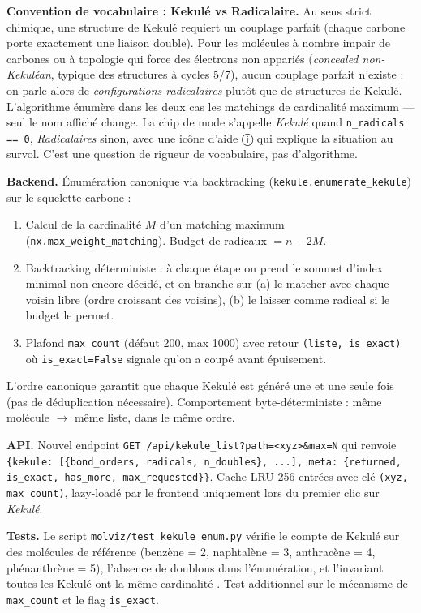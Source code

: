 \textbf{Convention de vocabulaire : Kekulé vs Radicalaire.} Au sens strict
chimique, une structure de Kekulé requiert un couplage parfait (chaque carbone
porte exactement une liaison double). Pour les molécules à nombre impair de
carbones ou à topologie qui force des électrons non appariés (\emph{concealed
non-Kekuléan}, typique des structures à cycles 5/7), aucun couplage parfait
n'existe : on parle alors de \emph{configurations radicalaires} plutôt que de
structures de Kekulé. L'algorithme énumère dans les deux cas les matchings de
cardinalité maximum --- seul le nom affiché change. La chip de mode s'appelle
\emph{Kekulé} quand \texttt{n\_radicals == 0}, \emph{Radicalaires} sinon, avec
une icône d'aide \og{}ⓘ\fg{} qui explique la situation au survol. C'est une
question de rigueur de vocabulaire, pas d'algorithme.

\textbf{Backend.} Énumération canonique via backtracking
(\texttt{kekule.enumerate\_kekule}) sur le squelette carbone :

\begin{enumerate}
  \item Calcul de la cardinalité $M$ d'un matching maximum
    (\texttt{nx.max\_weight\_matching}). Budget de radicaux $= n - 2M$.
  \item Backtracking déterministe : à chaque étape on prend le sommet
    d'index minimal non encore décidé, et on branche sur (a) le matcher
    avec chaque voisin libre (ordre croissant des voisins), (b) le laisser
    comme radical si le budget le permet.
  \item Plafond \texttt{max\_count} (défaut 200, max 1000) avec retour
    \texttt{(liste, is\_exact)} où \texttt{is\_exact=False} signale qu'on
    a coupé avant épuisement.
\end{enumerate}

L'ordre canonique garantit que chaque Kekulé est généré une et une seule
fois (pas de déduplication nécessaire). Comportement byte-déterministe :
même molécule $\to$ même liste, dans le même ordre.

\textbf{API.} Nouvel endpoint \texttt{GET /api/kekule\_list?path=<xyz>\&max=N}
qui renvoie \texttt{\{kekule: [\{bond\_orders, radicals, n\_doubles\}, ...],
meta: \{returned, is\_exact, has\_more, max\_requested\}\}}. Cache LRU 256
entrées avec clé \texttt{(xyz, max\_count)}, lazy-loadé par le frontend
uniquement lors du premier clic sur \emph{Kekulé}.

\textbf{Tests.} Le script
\texttt{molviz/test\_kekule\_enum.py} vérifie le compte de Kekulé sur des
molécules de référence (benzène = 2, naphtalène = 3, anthracène = 4,
phénanthrène = 5), l'absence de doublons dans l'énumération, et l'invariant
\og toutes les Kekulé ont la même cardinalité \fg{}. Test additionnel sur
le mécanisme de \texttt{max\_count} et le flag \texttt{is\_exact}.

